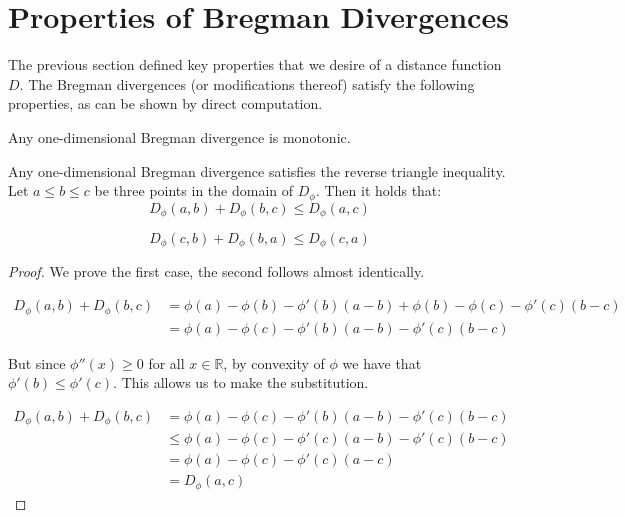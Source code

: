 \documentclass[11pt]{myclass}
\newcommand{\breg}{\ensuremath{D_\phi}}
\begin{document}
\section{Properties of Bregman Divergences}\label{sec:properties}
\label{sec:prop-sqrtd_s-phi}

The previous section defined key properties that we desire of a distance function $D$. The Bregman divergences (or modifications thereof) 
satisfy the following properties, as can be shown by direct computation. 

\begin{lemma}\label{lefttr}
Any one-dimensional Bregman divergence is monotonic.
\end{lemma}
\begin{lemma}\label{cover}
Any one-dimensional Bregman divergence satisfies the reverse triangle inequality. 
Let $a \leq b \leq c$ be three points in the domain of $\breg$. Then it holds that:
\begin{equation}
\breg(a,b) + \breg(b,c) \leq \breg(a,c) 
\end{equation}

\begin{equation}
  \breg(c,b) + \breg(b,a) \leq \breg(c,a)
\end{equation}
\end{lemma}

\begin{proof}
We prove the first case, the second follows almost identically.

\begin{align*}
\breg(a,b) + \breg(b,c) &= \phi(a) - \phi(b) - \phi'(b)(a-b) + \phi(b) - \phi(c) - \phi'(c)(b-c) \\
&= \phi(a) - \phi(c) - \phi'(b)(a-b) - \phi'(c)(b-c)
\end{align*}

But since $\phi''(x) \geq 0$ for all $x \in \mathbb{R}$, by convexity of $\phi$ we have that $\phi'(b) \leq \phi'(c)$. This allows us
to make the substitution.

\begin{align*}
 \breg(a,b) + \breg(b,c) &= \phi(a) - \phi(c) - \phi'(b)(a-b) - \phi'(c)(b-c) \\
& \leq \phi(a) - \phi(c) - \phi'(c)(a-b) - \phi'(c)(b-c) \\
&= \phi(a) - \phi(c) - \phi'(c)(a-c) \\
&= \breg(a,c)
\end{align*}

\end{proof}
\end{document}
